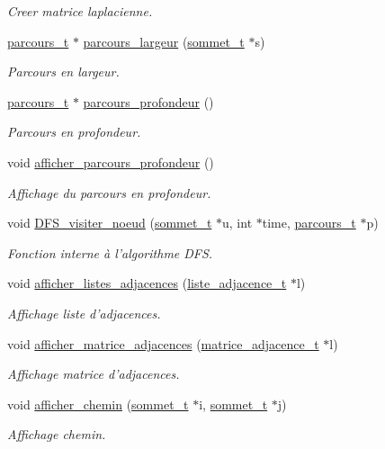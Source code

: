 \begin{DoxyCompactItemize}
\begin{DoxyCompactList}\small\item\em Creer matrice laplacienne. \end{DoxyCompactList}\item 
\hyperlink{structparcours__t}{parcours\+\_\+t} $\ast$ \hyperlink{classGraphe_ae824f4fe5eadd580272296b2e7cae561}{parcours\+\_\+largeur} (\hyperlink{structsommet}{sommet\+\_\+t} $\ast$s)
\begin{DoxyCompactList}\small\item\em Parcours en largeur. \end{DoxyCompactList}\item 
\hyperlink{structparcours__t}{parcours\+\_\+t} $\ast$ \hyperlink{classGraphe_a420e580d3803ee8ea7435ea7c15b2a91}{parcours\+\_\+profondeur} ()
\begin{DoxyCompactList}\small\item\em Parcours en profondeur. \end{DoxyCompactList}\item 
void \hyperlink{classGraphe_a8b6929c8f5869174c03f3ab2e4ec1fc8}{afficher\+\_\+parcours\+\_\+profondeur} ()
\begin{DoxyCompactList}\small\item\em Affichage du parcours en profondeur. \end{DoxyCompactList}\item 
void \hyperlink{classGraphe_a074adbc6a1f35fea18ede2a5be2ac767}{D\+F\+S\+\_\+visiter\+\_\+noeud} (\hyperlink{structsommet}{sommet\+\_\+t} $\ast$u, int $\ast$time, \hyperlink{structparcours__t}{parcours\+\_\+t} $\ast$p)
\begin{DoxyCompactList}\small\item\em Fonction interne à l'algorithme D\+F\+S. \end{DoxyCompactList}\item 
void \hyperlink{classGraphe_a0b150feac4a452b853ed6ed5be8d1c21}{afficher\+\_\+listes\+\_\+adjacences} (\hyperlink{structliste__adjacence__t}{liste\+\_\+adjacence\+\_\+t} $\ast$l)
\begin{DoxyCompactList}\small\item\em Affichage liste d'adjacences. \end{DoxyCompactList}\item 
void \hyperlink{classGraphe_a550984fee48fd6106686f45b09d7599d}{afficher\+\_\+matrice\+\_\+adjacences} (\hyperlink{structmatrice__adjacence__t}{matrice\+\_\+adjacence\+\_\+t} $\ast$l)
\begin{DoxyCompactList}\small\item\em Affichage matrice d'adjacences. \end{DoxyCompactList}\item 
void \hyperlink{classGraphe_a63126f39c2ab632b7a478bca7f902075}{afficher\+\_\+chemin} (\hyperlink{structsommet}{sommet\+\_\+t} $\ast$i, \hyperlink{structsommet}{sommet\+\_\+t} $\ast$j)
\begin{DoxyCompactList}\small\item\em Affichage chemin. \end{DoxyCompactList}\end{DoxyCompactItemize}
